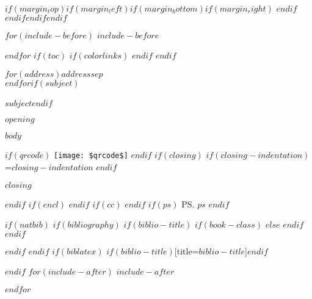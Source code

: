 \documentclass[$if(fontsize)$$fontsize$,$endif$$if(lang)$$babel-lang$,$endif$$if(papersize)$$papersize$paper,$endif$$for(classoption)$$classoption$$sep$,$endfor$]{letter}
\date{$date$}
\begin{document}
$if(margin_top)$$if(margin_left)$$if(margin_bottom)$$if(margin_right)$
		$endif$$endif$$endif$$endif$

$for(include-before)$
$include-before$

$endfor$
$if(toc)$
		{
				$if(colorlinks)$
				\hypersetup{linkcolor=$if(toccolor)$$toccolor$$else$$endif$}
				$endif$
				\setcounter{tocdepth}{$toc-depth$}
				\tableofcontents
			}
	$endif$

		\begin{letter}{$for(address)$$address$$sep$\\$endfor$$if(subject)$\\ ~ \\$subject$$endif$}
				\opening{$opening$}

			$body$
				\vspace{10mm}

			$if(qrcode)$
				\texttt{[image: \$qrcode\$]}
			$endif$
			$if(closing)$
			$if(closing-indentation)$
				\longindentation=$closing-indentation$
			$endif$
				\closing{$closing$}
			$endif$
			$if(encl)$
			$endif$
			$if(cc)$
			$endif$
			$if(ps)$
				\ps{$ps$}
			$endif$

		\end{letter}

	$if(natbib)$
$if(bibliography)$
$if(biblio-title)$
$if(book-class)$
		\renewcommand\bibname{$biblio-title$}
	$else$
		\renewcommand\refname{$biblio-title$}
	$endif$
$endif$
		

	$endif$
$endif$
$if(biblatex)$
		\printbibliography$if(biblio-title)$[title=$biblio-title$]$endif$

$endif$
$for(include-after)$
$include-after$

$endfor$
\end{document}
